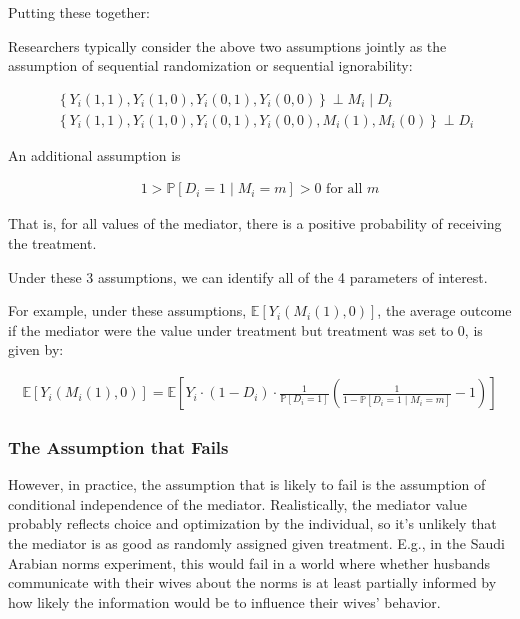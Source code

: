 \documentclass[10pt]{article}
\begin{document}
Putting these together:

\begin{notes}
    Researchers typically consider the above two assumptions jointly 
    as the assumption of sequential randomization or sequential ignorability:

    \begin{align}
        &\left\{Y_i(1,1), Y_i(1,0), Y_i(0,1), Y_i(0,0)\right\} \perp M_i \mid D_i \\
        &\left\{Y_i(1,1), Y_i(1,0), Y_i(0,1), Y_i(0,0), M_i(1), M_i(0)\right\} \perp D_i
    \end{align}
\end{notes}

\begin{notes}
    An additional assumption is 

    \begin{align}
        1>\mathbb{P}\left[D_i=1 \mid M_i=m\right]>0 \text { for all } m
    \end{align}

    That is, for all values of the mediator, 
    there is a positive probability of receiving the treatment.
\end{notes}

Under these 3 assumptions, we can 
identify all of the 4 parameters of interest.

For example, under these assumptions, $\mathbb{E}\left[Y_i\left(M_i(1), 0\right)\right]$,
the average outcome if the mediator were the value under treatment
but treatment was set to 0, is given by:

\begin{align}
    \mathbb{E}\left[Y_i\left(M_i(1), 0\right)\right]=\mathbb{E}\left[Y_i \cdot\left(1-D_i\right) \cdot \frac{1}{\mathbb{P}\left[D_i=1\right]}\left(\frac{1}{1-\mathbb{P}\left[D_i=1 \mid M_i=m\right]}-1\right)\right]
\end{align}

\subsubsection{The Assumption that Fails}

However, in practice, the assumption that is likely to fail
is the assumption of conditional independence of the mediator.
Realistically, the mediator value probably reflects 
choice and optimization by the individual, so it's unlikely
that the mediator is as good as randomly assigned given treatment.
E.g., in the Saudi Arabian norms experiment,
this would fail in a world where whether husbands communicate with their 
wives about the norms is at least partially informed by
how likely the information would be to influence their wives' behavior.
\end{document}
